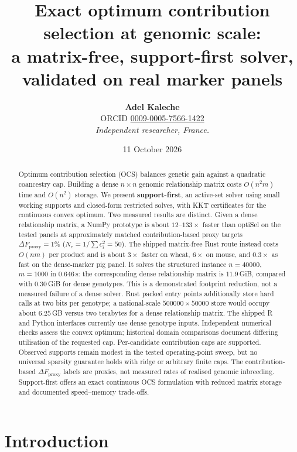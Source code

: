 \documentclass[11pt]{article}
\title{\bfseries Exact optimum contribution selection at genomic scale:\\ a matrix-free, support-first solver, validated on real marker panels}
\author{\textbf{Adel Kaleche}\\[2pt]
  \small ORCID \href{https://orcid.org/0009-0005-7566-1422}{0009-0005-7566-1422}\\[2pt]
  \small\itshape Independent researcher, France.}
\date{11 October 2026}
\begin{document}
\maketitle

\begin{abstract}
\noindent
Optimum contribution selection (OCS) balances genetic gain against a quadratic coancestry cap. Building a dense $n\times n$ genomic relationship matrix costs $O(n^2m)$ time and $O(n^2)$ storage. We present \textbf{support-first}, an active-set solver using small working supports and closed-form restricted solves, with KKT certificates for the continuous convex optimum. Two measured results are distinct. Given a dense relationship matrix, a NumPy prototype is about $12$--$133\times$ faster than optiSel on the tested panels at approximately matched contribution-based proxy targets $\Delta F_{\mathrm{proxy}}=1\%$ ($N_e=1/\sum c_i^2=50$). The shipped matrix-free Rust route instead costs $O(nm)$ per product and is about $3\times$ faster on wheat, $6\times$ on mouse, and $0.3\times$ as fast on the dense-marker pig panel. It solves the structured instance $n=40000$, $m=1000$ in $0.646$\,s: the corresponding dense relationship matrix is $11.9$\,GiB, compared with $0.30$\,GiB for dense genotypes. This is a demonstrated footprint reduction, not a measured failure of a dense solver. Rust packed entry points additionally store hard calls at two bits per genotype; a national-scale $500000\times50000$ store would occupy about $6.25$\,GB versus two terabytes for a dense relationship matrix. The shipped R and Python interfaces currently use dense genotype inputs. Independent numerical checks assess the convex optimum; historical domain comparisons document differing utilisation of the requested cap. Per-candidate contribution caps are supported. Observed supports remain modest in the tested operating-point sweep, but no universal sparsity guarantee holds with ridge or arbitrary finite caps. The contribution-based $\Delta F_{\mathrm{proxy}}$ labels are proxies, not measured rates of realised genomic inbreeding. Support-first offers an exact continuous OCS formulation with reduced matrix storage and documented speed--memory trade-offs.
\end{abstract}

\section{Introduction}
\end{document}
